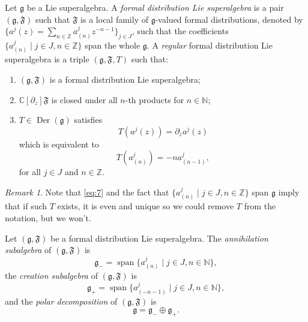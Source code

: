 \documentclass[a4paper, 12pt, reqno]{amsart}
\theoremstyle{remark}
\newtheorem{remark}[theorem]{Remark}
\numberwithin{equation}{subsection}
\DeclareMathOperator{\vspan}{span}
\DeclareMathOperator{\Der}{Der}
\begin{document}
Let $\mathfrak{g}$ be a Lie superalgebra.
A \emph{formal distribution Lie superalgebra} is a pair $(\mathfrak{g}, \mathfrak{F})$ such that $\mathfrak{F}$ is a local family of $\mathfrak{g}$-valued formal distributions, denoted by $\{a^j(z) = \sum_{n \in \mathbb{Z}}a^j_{(n)}z^{-n - 1}\}_{j \in J}$, such that the coefficients $\{a^j_{(n)} \mid j \in J, n \in \mathbb{Z}\}$ span the whole $\mathfrak{g}$.
A \emph{regular} formal distribution Lie superalgebra is a triple $(\mathfrak{g}, \mathfrak{F}, T)$ such that:
\begin{enumerate}
\item $(\mathfrak{g}, \mathfrak{F})$ is a formal distribution Lie superalgebra;
\item $\mathbb{C}[\partial_z]\mathfrak{F}$ is closed under all $n$-th products for $n \in \mathbb{N}$;
\item $T \in \Der(\mathfrak{g})$ satisfies
  \begin{equation*}
    T(a^j(z)) = \partial_za^j(z)
  \end{equation*}
  which is equivalent to
  \begin{equation}
    \label{eq:7}
    T(a^j_{(n)}) = -na^j_{(n - 1)},
  \end{equation}
  for all $j \in J$ and $n \in \mathbb{Z}$. 
\end{enumerate}
\begin{remark}
  \label{rmk:4}
  Note that \eqref{eq:7} and the fact that $\{a^j_{(n)} \mid j \in J, n \in \mathbb{Z}\}$ span $\mathfrak{g}$ imply that if such $T$ exists, it is even and unique so we could remove $T$ from the notation, but we won't.
\end{remark}

Let $(\mathfrak{g}, \mathfrak{F})$ be a formal distribution Lie superalgebra.
The \emph{annihilation subalgebra} of $(\mathfrak{g}, \mathfrak{F})$ is
\begin{equation*}
  \mathfrak{g}_- = \vspan\{a^j_{(n)} \mid j \in J, n \in \mathbb{N}\},
\end{equation*}
the \emph{creation subalgebra} of $(\mathfrak{g}, \mathfrak{F})$ is
\begin{equation*}
  \mathfrak{g}_+ = \vspan\{a^j_{(-n - 1)} \mid j \in J, n \in \mathbb{N}\},
\end{equation*}
and the \emph{polar decomposition} of $(\mathfrak{g}, \mathfrak{F})$ is
\begin{equation*}
  \mathfrak{g} = \mathfrak{g}_- \oplus \mathfrak{g}_+.
\end{equation*}
\end{document}
